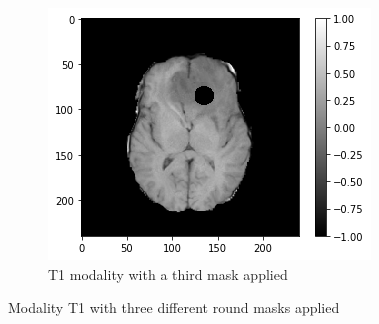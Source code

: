 \begin{figure}[H]
    \begin{subfigure}[t]{.33\textwidth}
        \centering
        \includegraphics[width=\linewidth]{chapters/06_hdm/images_masked/masked_8.png}
        \caption{T1 modality with a third mask applied}
    \end{subfigure}
    \caption{Modality T1 with three different round masks applied}
    \label{hdm_masks_1}
\end{figure}

